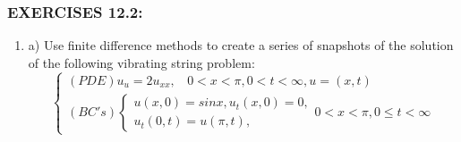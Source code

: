 \documentclass[../main.tex]{subfiles}
\begin{document}
\subsubsection{EXERCISES 12.2:}

\begin{enumerate}
 \item 
 		a) Use finite difference methods to create a series of snapshots of the solution of the following 
vibrating string problem:
$$	\begin{cases} 
	(PDE) u_u=2u_{xx},
	~~~~0<x<\pi, 0<t<\infty,u=(x,t)\\
(BC's)
		\begin{cases}
		u(x,0)=sin x, u_t(x,0)=0,\\
		u_t(0,t)=u(\pi ,t),
		\end{cases}
		0<x<\pi, 0\leqslant t< \infty 
	\end{cases}$$


\end{enumerate}
\end{document}
